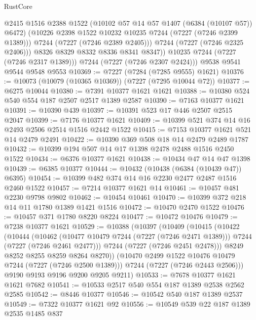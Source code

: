 \begin{lexlean}{RustCore}
\begin{coremodule}
                @2415
                @1516
                @2388
                @1522
                (@10102 @57 @14 @57 @1407 (@6384 (@10107 @57)) @6472)
                (@10226 @2398 @1522 @10232 @10235 @7244 (@7227 (@7246 @2399 @1389)))
                @7244
                (@7227 (@7246 @2389 @2405)))
              @7244
              (@7227 (@7246 @2325 @2406)))
            @8326
            @8329
            @8332
            @8336
            @8341
            @8347))
        @10235
        @7244
        (@7227 (@7246 @2317 @1389)))
      @7244
      (@7227 (@7246 @2307 @2424)))
    @9538
    @9541
    @9544
    @9548
    @9553
@10369 := @7227 (@7284 (@7285 @9555) @1621)
@10376 := @10073 (@10079 (@10365 @10369)) (@7227 (@7295 @10044 @72))
@10377 := @6275 @10044
@10380 := @7391 @10377 @1621 @1621
@10388 := @10380 @524 @540 @554 @187 @2507 @2517 @1389 @2587
@10390 := @7163 @10377 @1621
@10391 := @10390 @439
@10397 := @10391 @523 @17 @446 @2507 @2515 @2047
@10399 := @7176 @10377 @1621
@10409 := @10399 @521 @374 @14 @16 @2493 @2506 @2514 @1516 @2442 @1522
@10415 := @7153 @10377 @1621 @521 @14 @2479 @2491
@10422 := @10390 @369 @508 @18 @14 @2479 @2489 @1787
@10432 := @10399 @194 @507 @14 @17 @1398 @2478 @2488 @1516 @2450 @1522
@10434 := @6376 @10377 @1621
@10438 := @10434 @47 @14 @47 @1398
@10439 := @6385 @10377
@10444 := @10432 (@10438 (@6384 (@10439 @47)) @6395)
@10454 := @10399 @482 @374 @14 @16 @2230 @2477 @2487 @1516 @2460 @1522
@10457 := @7214 @10377 @1621 @14
@10461 := @10457 @481 @2230 @9798 @9802
@10462 := @10454 @10461
@10470 := @10399 @372 @218 @14 @11 @1780 @1389 @1421 @1516
@10472 := @10470 @2470 @1522
@10476 := @10457 @371 @1780 @8220 @8224
@10477 := @10472 @10476
@10479 := @7238 @10377 @1621
@10529 := @10388
    (@10397
      (@10409
        (@10415
          (@10422
            (@10444
              (@10462
                (@10477 @10479 @7244 (@7227 (@7246 @2471 @1389)))
                @7244
                (@7227 (@7246 @2461 @2477)))
              @7244
              (@7227 (@7246 @2451 @2478)))
            @8249
            @8252
            @8255
            @8259
            @8264
            @8270))
        (@10470 @2499 @1522 @10476 @10479 @7244 (@7227 (@7246 @2500 @1389)))
        @7244
        (@7227 (@7246 @2443 @2506)))
      @9190
      @9193
      @9196
      @9200
      @9205
      @9211)
@10533 := @7678 @10377 @1621 @1621 @7682
@10541 := @10533 @2517 @540 @554 @187 @1389 @2538 @2562 @2585
@10542 := @8446 @10377
@10546 := @10542 @540 @187 @1389 @2537
@10549 := @7322 @10377 @1621 @92
@10556 := @10549 @539 @22 @187 @1389 @2535 @1485 @837

\end{coremodule}
\end{lexlean}
